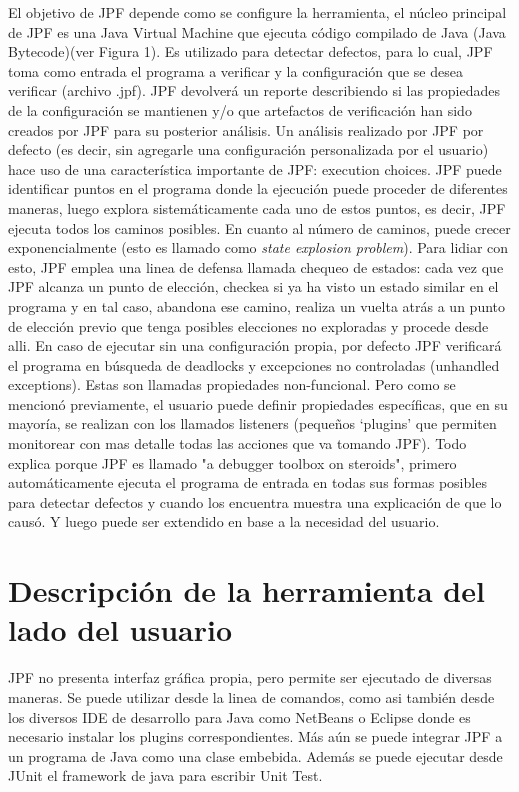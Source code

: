 \documentclass[runningheads]{llncs}
\begin{document}
El objetivo de JPF depende como se configure la herramienta, el n\'ucleo principal de JPF es una Java Virtual Machine que ejecuta c\'odigo compilado de Java (Java Bytecode)(ver Figura 1). Es utilizado para detectar defectos, para lo cual, JPF toma como entrada el programa a verificar y la configuraci\'on que se desea verificar (archivo .jpf). JPF devolver\'a un reporte describiendo si las propiedades de la configuraci\'on se mantienen y/o que artefactos de verificaci\'on han sido creados por JPF para su posterior an\'alisis. 
Un an\'alisis realizado por JPF por defecto (es decir, sin agregarle una configuraci\'on personalizada por el usuario) hace uso de una caracter\'istica importante de JPF: execution choices. JPF puede identificar puntos en el programa donde la ejecuci\'on puede proceder de diferentes maneras, luego explora sistem\'aticamente cada uno de estos puntos, es decir, JPF ejecuta todos los caminos posibles. En cuanto al n\'umero de caminos, puede crecer exponencialmente (esto es llamado como \textit{state explosion problem}). Para lidiar con esto, JPF emplea una linea de defensa llamada chequeo de estados: cada vez que JPF alcanza un punto de elecci\'on, checkea si ya ha visto un estado similar en el programa y en tal caso, abandona ese camino, realiza un vuelta atr\'as a un punto de elecci\'on previo que tenga posibles elecciones no exploradas y procede desde alli. 
En caso de ejecutar sin una configuraci\'on propia, por defecto JPF verificar\'a el programa en b\'usqueda de deadlocks y excepciones no controladas (unhandled exceptions). Estas son llamadas propiedades non-funcional. Pero como se mencion\'o previamente, el usuario puede definir propiedades espec\'ificas, que en su mayor\'ia, se realizan con los llamados listeners (peque\~nos ‘plugins’ que permiten monitorear con mas detalle todas las acciones que va tomando JPF). Todo explica porque JPF es llamado "a debugger toolbox on steroids", primero autom\'aticamente ejecuta el programa de entrada en todas sus formas posibles para detectar defectos y cuando los encuentra muestra una explicaci\'on de que lo caus\'o. Y luego puede ser extendido en base a la necesidad del usuario.


\section{Descripci\'on de la herramienta del lado del usuario}

JPF no presenta interfaz gr\'afica propia, pero permite ser ejecutado de diversas maneras. Se puede utilizar desde la linea de comandos, como asi tambi\'en desde los diversos IDE de desarrollo para Java como NetBeans o Eclipse donde es necesario instalar los plugins correspondientes. M\'as a\'un se puede integrar JPF a un programa de Java como una clase embebida.
Adem\'as se puede ejecutar desde JUnit el framework de java para escribir Unit Test.
\end{document}
